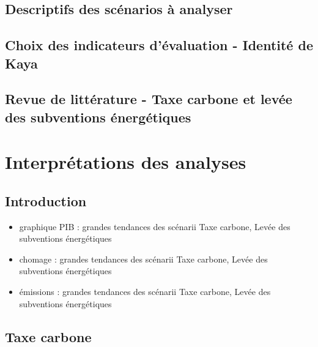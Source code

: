 \documentclass[
]{article}
\providecommand{\tightlist}{%
  \setlength{\itemsep}{0pt}\setlength{\parskip}{0pt}}
\begin{document}
\hypertarget{descriptifs-des-scuxe9narios-uxe0-analyser}{%
\subsection{Descriptifs des scénarios à
analyser}\label{descriptifs-des-scuxe9narios-uxe0-analyser}}

\hypertarget{choix-des-indicateurs-duxe9valuation---identituxe9-de-kaya}{%
\subsection{Choix des indicateurs d'évaluation - Identité de
Kaya}\label{choix-des-indicateurs-duxe9valuation---identituxe9-de-kaya}}

\hypertarget{revue-de-littuxe9rature---taxe-carbone-et-levuxe9e-des-subventions-uxe9nerguxe9tiques}{%
\subsection{Revue de littérature - Taxe carbone et levée des subventions
énergétiques}\label{revue-de-littuxe9rature---taxe-carbone-et-levuxe9e-des-subventions-uxe9nerguxe9tiques}}

\hypertarget{interpruxe9tations-des-analyses}{%
\section{Interprétations des
analyses}\label{interpruxe9tations-des-analyses}}

\hypertarget{introduction-1}{%
\subsection{Introduction}\label{introduction-1}}

\begin{itemize}
\tightlist
\item
  graphique PIB : grandes tendances des scénarii Taxe carbone, Levée des
  subventions énergétiques
\item
  chomage : grandes tendances des scénarii Taxe carbone, Levée des
  subventions énergétiques
\item
  émissions : grandes tendances des scénarii Taxe carbone, Levée des
  subventions énergétiques
\end{itemize}

\hypertarget{taxe-carbone}{%
\subsection{Taxe carbone}\label{taxe-carbone}}
\end{document}
